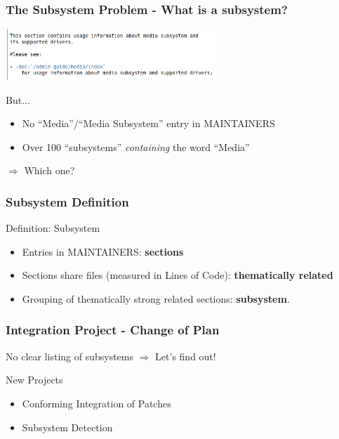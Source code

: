 \documentclass[9pt]{beamer}
\begin{document}
	\begin{frame}
	\frametitle{The Subsystem Problem - What is a subsystem?}
	\begin{center}
     	\includegraphics[width=0.6\textwidth]{pics/Media_subsystem.png}
	\end{center}

	\begin{block}{But... }
		\begin{itemize} 
		\item No ``Media''/``Media Subsystem'' entry in MAINTAINERS
		\item Over 100 ``subsystems'' \textit{containing} the word ``Media''
		\end{itemize}
	\end{block}
	\begin{center}
	$\Rightarrow$ Which one?
	\end{center}
	\end{frame}

	\begin{frame} 
	\frametitle{Subsystem Definition}
		\begin{block}{Definition: Subsystem}
			\begin{itemize}
				\item Entries in MAINTAINERS: \textbf{sections}
				\item Sections share files (measured in Lines of Code): \textbf{thematically related}
				\item Grouping of thematically strong related sections: \textbf{subsystem}.
			\end{itemize}

		\end{block}
	\end{frame}

	\begin{frame}
	\frametitle{Integration Project - Change of Plan}
		\begin{block}{No clear listing of subsystems}
			$\Rightarrow$ Let's find out!
		\end{block}


		\begin{block}{New Projects}
			\begin{itemize}
				\item Conforming Integration of Patches
				\item Subsystem Detection
			\end{itemize}
		\end{block}
	\end{frame}
\end{document}
